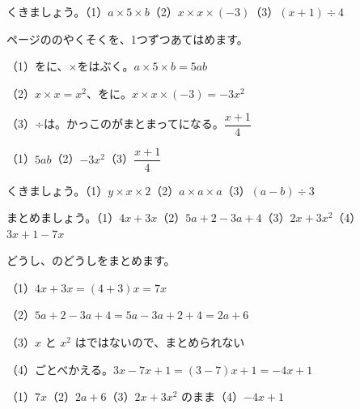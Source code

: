 \clearpage
{}

\begin{reidai}
くきましょう。\quad（1）\nobreak $a\times5\times b$\quad（2）\nobreak $x\times x\times(-3)$\quad（3）\nobreak $(x+1)\div4$\par
\kangaekata \pageref{bk:2-12:yakusoku}ページののやくそくを、1つずつあてはめます。\par
\shiki（1）をに、×をはぶく。$a\times5\times b=5ab$\par
\hspace*{2.6\zw}（2）$x\times x=x^2$、をに。$x\times x\times(-3)=-3x^2$\par
\hspace*{2.6\zw}（3）÷は。かっこのがまとまってになる。$\dfrac{x+1}{4}$\par
\kotae（1）\nobreak $5ab$\quad（2）\nobreak $-3x^2$\quad（3）\nobreak $\dfrac{x+1}{4}$
\end{reidai}

\begin{jibun}
くきましょう。\quad（1）\nobreak $y\times x\times2$\quad（2）\nobreak $a\times a\times a$\quad（3）\nobreak $(a-b)\div3$
\end{jibun}

\begin{reidai}
まとめましょう。\quad（1）\nobreak $4x+3x$\quad（2）\nobreak $5a+2-3a+4$\quad（3）\nobreak $2x+3x^2$\quad（4）\nobreak $3x+1-7x$\par
\kangaekata {}どうし、のどうしをまとめます。\par
\shiki（1）$4x+3x=(4+3)x=7x$\par
\hspace*{2.6\zw}（2）$5a+2-3a+4=5a-3a+2+4=2a+6$\par
\hspace*{2.6\zw}（3）$x$ と $x^2$ はではないので、まとめられない\par
\hspace*{2.6\zw}（4）ごとべかえる。$3x-7x+1=(3-7)x+1=-4x+1$\par
\kotae（1）\nobreak $7x$\quad（2）\nobreak $2a+6$\quad（3）\nobreak $2x+3x^2$ のまま\quad（4）\nobreak $-4x+1$
\end{reidai}


